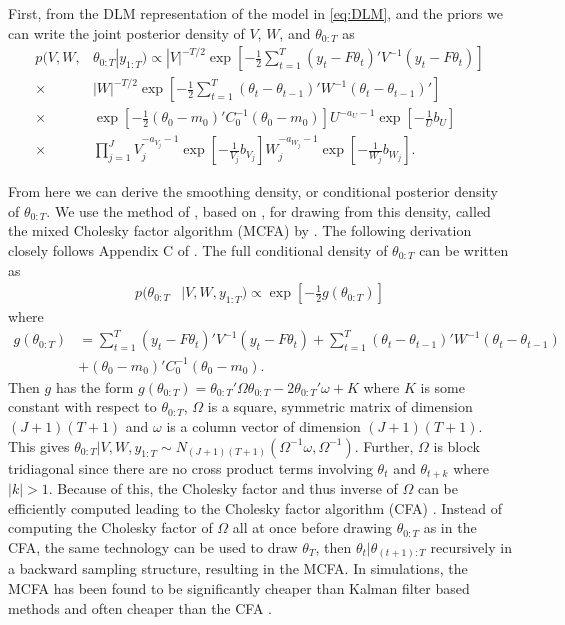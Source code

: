 \documentclass[graybox]{svmult}
\begin{document}
First, from the DLM representation of the model in \eqref{eq:DLM}, and the priors we can write the joint posterior density of $V$, $W$, and $\theta_{0:T}$ as
\begin{align}
p(V,W,&\theta_{0:T}|y_{1:T}) \propto |V|^{-T/2}\exp\left[-\frac{1}{2}\sum_{t=1}^T(y_t - F\theta_t)'V^{-1}(y_t - F\theta_t)\right]\nonumber\\
\times&|W|^{-T/2}\exp\left[-\frac{1}{2}\sum_{t=1}^T(\theta_t - \theta_{t-1})'W^{-1}(\theta_t - \theta_{t-1})'\right]\nonumber\\
\times&\exp\left[-\frac{1}{2}(\theta_0-m_0)'C_0^{-1}(\theta_0-m_0)\right] U^{-a_{U} - 1}\exp\left[-\frac{1}{U}b_{U}\right]\nonumber\\
\times&\prod_{j=1}^JV_j^{-a_{V_j} - 1}\exp\left[-\frac{1}{V_j}b_{V_j}\right]W_j^{-a_{W_j} - 1}\exp\left[-\frac{1}{W_j}b_{W_j}\right].\label{eq:post}
\end{align}

 From here we can derive the smoothing density, or conditional posterior density of $\theta_{0:T}$. We use the method of \cite{mccausland2011simulation}, based on \cite{rue2001fast}, for drawing from this density, called the mixed Cholesky factor algorithm (MCFA) by \cite{simpson2014interweaving}. The following derivation closely follows Appendix C of \cite{simpson2014interweaving}. The full conditional density of $\theta_{0:T}$ can be written as
\begin{align*}
p(\theta_{0:T}&|V,W,y_{1:T}) \propto \exp\left[-\frac{1}{2}g(\theta_{0:T})\right]
\end{align*}
where
\begin{align*}
g(\theta_{0:T})&=\sum_{t=1}^T(y_t - F\theta_t)'V^{-1}(y_t - F\theta_t) + \sum_{t=1}^T(\theta_t - \theta_{t-1})'W^{-1}(\theta_t - \theta_{t-1})\\
& + (\theta_0-m_0)'C_0^{-1}(\theta_0-m_0).
\end{align*}
Then $g$ has the form $g(\theta_{0:T}) = \theta_{0:T}'\Omega\theta_{0:T} - 2\theta_{0:T}'\omega + K$ where $K$ is some constant with respect to $\theta_{0:T}$, $\Omega$ is a square, symmetric matrix of dimension $(J+1)(T+1)$ and $\omega$ is a column vector of dimension $(J+1)(T+1)$. This gives $\theta_{0:T}|V,W,y_{1:T}\sim N_{(J+1)(T+1)}(\Omega^{-1}\omega, \Omega^{-1})$. Further, $\Omega$ is block tridiagonal since there are no cross product terms involving $\theta_t$ and $\theta_{t + k}$ where $|k|>1$. Because of this, the Cholesky factor and thus inverse of $\Omega$ can be efficiently computed leading to the Cholesky factor algorithm (CFA) \citep{rue2001fast}. Instead of computing the Cholesky factor of $\Omega$ all at once before drawing $\theta_{0:T}$ as in the CFA, the same technology can be used to draw $\theta_T$, then $\theta_t|\theta_{(t+1):T}$ recursively in a backward sampling structure, resulting in the MCFA. In simulations, the MCFA has been found to be significantly cheaper than Kalman filter based methods and often cheaper than the CFA \citep{mccausland2011simulation}.
\end{document}
